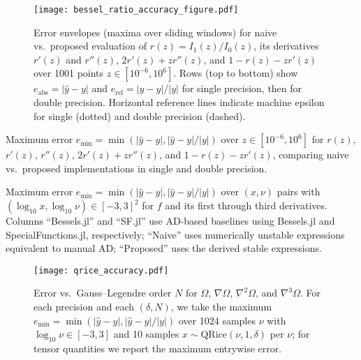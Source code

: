 \documentclass{article}
\begin{document}
\begin{figure}[t]
  \centering
  \texttt{[image: bessel\_ratio\_accuracy\_figure.pdf]}
  \caption{Error envelopes (maxima over sliding windows) for naive vs.\ proposed evaluation of $r(z) = I_1(z)/I_0(z)$, its derivatives $r'(z)$ and $r''(z)$, $2 r'(z) + z r''(z)$, and $1 - r(z) - z r'(z)$ over 1001 points $z \in [10^{-6}, 10^{6}]$. Rows (top to bottom) show $e_{\mathrm{abs}} = |\hat{y} - y|$ and $e_{\mathrm{rel}} = |\hat{y} - y| / |y|$ for single precision, then for double precision. Horizontal reference lines indicate machine epsilon for single (dotted) and double precision (dashed).}
  \label{fig:bessel-accuracy}
\end{figure}

\begin{table}[t]
  \centering
  
  \caption{Maximum error $e_{\min} = \min(|\hat{y} - y|, |\hat{y} - y| / |y|)$ over $z \in [10^{-6}, 10^{6}]$ for $r(z)$, $r'(z)$, $r''(z)$, $2 r'(z) + z r''(z)$, and $1 - r(z) - z r'(z)$, comparing naive vs.\ proposed implementations in single and double precision.}
  \label{fig:bessel-table}
\end{table}

\begin{table}[t]
  \centering
  \resizebox{\textwidth}{!}{}
  \caption{Maximum error $e_{\min} = \min(|\hat{y} - y|, |\hat{y} - y| / |y|)$ over $(x, \nu)$ pairs with $(\log_{10} x, \log_{10} \nu) \in [-3, 3]^2$ for $f$ and its first through third derivatives. Columns ``Bessels.jl'' and ``SF.jl'' use AD-based baselines using Bessels.jl and SpecialFunctions.jl, respectively; ``Naive'' uses numerically unstable expressions equivalent to manual AD; ``Proposed'' uses the derived stable expressions.}
  \label{fig:nll-table}
\end{table}

\begin{figure}[t]
  \centering
  \texttt{[image: qrice\_accuracy.pdf]}
  \caption{Error vs.\ Gauss--Legendre order $N$ for $\Omega$, $\nabla\Omega$, $\nabla^2\Omega$, and $\nabla^3\Omega$. For each precision and each $(\delta, N)$, we take the maximum $e_{\min} = \min(|\hat{y} - y|, |\hat{y} - y| / |y|)$ over 1024 samples $\nu$ with $\log_{10}\nu \in [-3, 3]$ and 10 samples $x \sim \mathrm{QRice}(\nu, 1, \delta)$ per $\nu$; for tensor quantities we report the maximum entrywise error.}
  \label{fig:qrice-accuracy}
\end{figure}
\end{document}

